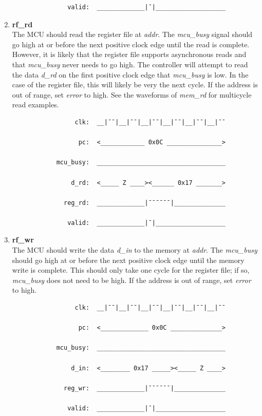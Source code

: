 \documentclass[10pt,a4paper]{article}
\begin{document}
\begin{enumerate}
\begin{verbatim}
               valid:  _____________|¯|___________________
        \end{verbatim}

    \item\textbf{rf\_rd}\\
    The MCU should read the register file at \emph{addr}. The \emph{mcu\_busy} signal should go
    high at or before the next positive clock edge until the read is complete. However, it is
    likely that the register file supports asynchronous reads and that \emph{mcu\_busy} never
    needs to go high. The controller will attempt to read the data \emph{d\_rd} on the first positive clock edge that
    \emph{mcu\_busy} is low. In the case of the register file, this will likely be very the next
    cycle. If the address is out of range, set \emph{error} to high. See the waveforms of
    \emph{mem\_rd} for multicycle read examples.

        \begin{verbatim}
                 clk:  __|¯¯|__|¯¯|__|¯¯|__|¯¯|__|¯¯|__|¯¯

                  pc:  <____________ 0x0C _______________>

            mcu_busy:  ___________________________________

                d_rd:  <_____ Z ____><______ 0x17 _______>

              reg_rd:  _____________|¯¯¯¯¯¯|______________

               valid:  _____________|¯|___________________
        \end{verbatim}

    \item\textbf{rf\_wr}\\
    The MCU should write the data \emph{d\_in} to the memory at \emph{addr}. The \emph{mcu\_busy} should go
    high at or before the next positive clock edge until the memory write is complete. This should
    only take one cycle for the register file; if so, \emph{mcu\_busy} does not need to be high.
    If the address is out of range, set \emph{error} to high.

        \begin{verbatim}
                 clk:  __|¯¯|__|¯¯|__|¯¯|__|¯¯|__|¯¯|__|¯¯

                  pc:  <_____________ 0x0C ______________>

            mcu_busy:  ___________________________________

                d_in:  <________ 0x17 _____><_____ Z ____> 

              reg_wr:  _____________|¯¯¯¯¯¯|______________

               valid:  _____________|¯|___________________
        \end{verbatim}

\end{enumerate}
\end{document}
